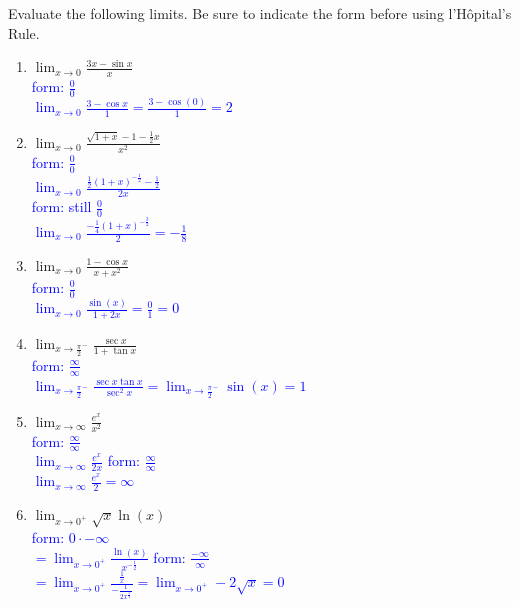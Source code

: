 \documentclass{ximera}
\begin{document}
\begin{exercise}
Evaluate the following limits.  Be sure to indicate the form before using l'H\^opital's Rule.

\begin{enumerate}
    \item $\displaystyle \lim_{x\rightarrow 0} \frac{3x-\sin x}{x}$\\
    \textcolor{blue}{ form: $\frac{0}{0}$\\
    $\lim_{x\rightarrow 0}\frac{3-\cos x}{1}=\frac{3-\cos(0)}{1}=2$}
   
    \item $\displaystyle \lim_{x\rightarrow 0}\frac{\sqrt{1+x}-1-\frac{1}{2}x}{x^2}$\\
    \textcolor{blue}{ form: $\frac{0}{0}$\\
    $\lim_{x\rightarrow 0} \frac{\frac{1}{2}(1+x)^{-\frac{1}{2}}-\frac{1}{2}}{2x}$\\
    form: still $\frac{0}{0}$\\
    $\lim_{x\rightarrow 0} \frac{-\frac{1}{4}(1+x)^{-\frac{3}{2}}}{2}=-\frac{1}{8}$}

    \item $\displaystyle \lim_{x\rightarrow 0}\frac{1-\cos x}{x+x^2}$\\
     \textcolor{blue}{ form: $\frac{0}{0}$\\
    $\lim_{x\rightarrow 0}\frac{\sin(x)}{1+2x}=\frac{0}{1}=0$}

    \item  $\displaystyle \lim_{x\rightarrow \frac{\pi}{2}^-}\frac{\sec x}{1+\tan x}$\\
      \textcolor{blue}{ form: $\frac{\infty}{\infty}$\\
    $\lim_{x\rightarrow \frac{\pi}{2}^-} \frac{\sec x \tan x}{\sec^2 x}=\lim_{x\rightarrow \frac{\pi}{2}^-} \sin(x)=1$}

    \item $\displaystyle \lim_{x\rightarrow \infty} \frac{e^x}{x^2}$\\
    \textcolor{blue}{ form: $\frac{\infty}{\infty}$\\
    $\lim_{x\rightarrow \infty} \frac{e^x}{2x}$  form: $\frac{\infty}{\infty}$\\
    $\lim_{x\rightarrow \infty} \frac{e^x}{2}=\infty$}

    \item  $\displaystyle \lim_{x\rightarrow 0^+} \sqrt{x}\ln(x)$\\
     \textcolor{blue}{ form: $0\cdot -\infty$\\
    $=\lim_{x\rightarrow 0^+}\frac{\ln(x)}{x^{-\frac{1}{2}}}$ form: $\frac{-\infty}{\infty}$\\
    $=\lim_{x\rightarrow 0^+} \frac{\frac{1}{x}}{-\frac{1}{2x^{\frac{3}{2}}}}=\lim_{x\rightarrow 0^+} -2\sqrt{x}=0$}


\end{enumerate}
\end{exercise}
\end{document}
